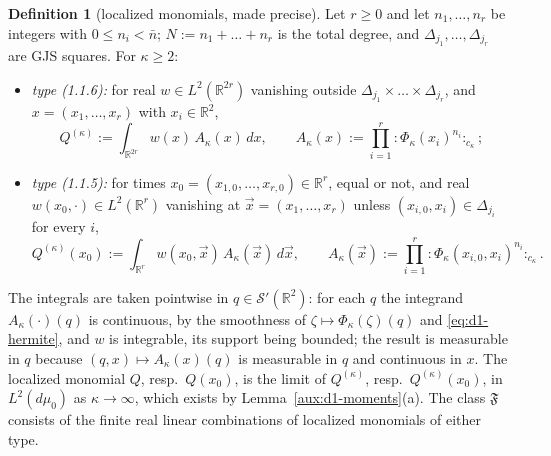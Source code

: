 \documentclass[11pt,a4paper]{article}
\theoremstyle{plain}
\theoremstyle{definition}
\theoremstyle{plain}
\theoremstyle{definition}
\newtheorem{auxdef}[auxlemma]{Definition}
\newcommand{\R}{\mathbb{R}}
\newcommand{\dmu}{d\mu_0}
\begin{document}
\begin{auxdef}[localized monomials, made precise]\label{aux:d1-obs}
Let $r\ge0$ and let $n_1,\dots,n_r$ be integers with $0\le n_i<\bar n$; $N:=n_1+\dots+n_r$ is
the total degree, and $\Delta_{j_1},\dots,\Delta_{j_r}$ are GJS squares. For $\kappa\ge2$:
\begin{itemize}
\item[(a)] \emph{type (1.1.6):} for real $w\in L^2(\R^{2r})$ vanishing outside
$\Delta_{j_1}\times\dots\times\Delta_{j_r}$, and $x=(x_1,\dots,x_r)$ with $x_i\in\R^2$,
\[
 Q^{(\kappa)}:=\int_{\R^{2r}}w(x)\,A_\kappa(x)\,dx,\qquad
 A_\kappa(x):=\prod_{i=1}^r{:}\Phi_\kappa(x_i)^{n_i}{:}_{c_\kappa} ;
\]
\item[(b)] \emph{type (1.1.5):} for times $x_0=(x_{1,0},\dots,x_{r,0})\in\R^r$, equal or not,
and real $w(x_0,\cdot)\in L^2(\R^r)$ vanishing at $\vec x=(x_1,\dots,x_r)$ unless
$(x_{i,0},x_i)\in\Delta_{j_i}$ for every $i$,
\[
 Q^{(\kappa)}(x_0):=\int_{\R^r}w(x_0,\vec x)\,A_\kappa(\vec x)\,d\vec x,\qquad
 A_\kappa(\vec x):=\prod_{i=1}^r{:}\Phi_\kappa(x_{i,0},x_i)^{n_i}{:}_{c_\kappa} .
\]
\end{itemize}
The integrals are taken pointwise in $q\in\mathcal S'(\R^2)$: for each $q$ the integrand
$A_\kappa(\cdot)(q)$ is continuous, by the smoothness of $\zeta\mapsto\Phi_\kappa(\zeta)(q)$ and
\eqref{eq:d1-hermite}, and $w$ is integrable, its support being bounded; the result is
measurable in $q$ because $(q,x)\mapsto A_\kappa(x)(q)$ is measurable in $q$ and continuous in
$x$. The localized monomial $Q$, resp.\ $Q(x_0)$, is the limit of $Q^{(\kappa)}$, resp.\
$Q^{(\kappa)}(x_0)$, in $L^2(\dmu)$ as $\kappa\to\infty$, which exists by
Lemma~\ref{aux:d1-moments}(a). The class $\mathfrak F$ consists of the finite real linear
combinations of localized monomials of either type.
\end{auxdef}
\end{document}
